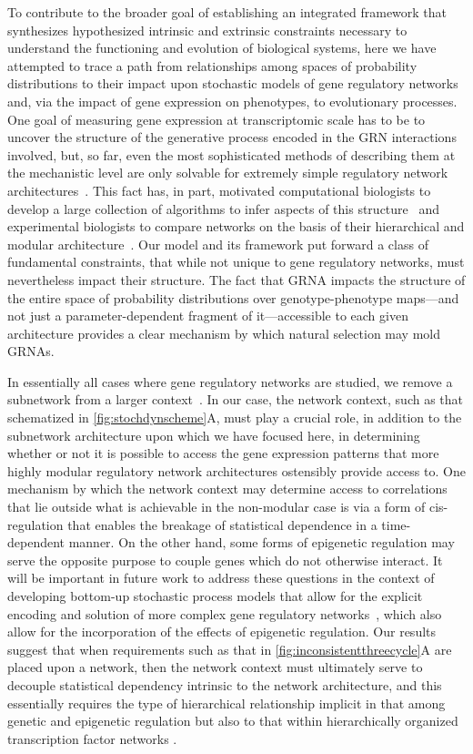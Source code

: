To contribute to the broader goal of establishing an integrated framework that synthesizes hypothesized intrinsic and extrinsic constraints necessary to understand the functioning and evolution of biological systems, here we have attempted to trace a path from relationships among spaces of probability distributions to their impact upon stochastic models of gene regulatory networks and, via the impact of gene expression on phenotypes, to evolutionary processes. One goal of measuring gene expression at transcriptomic scale has to be to uncover the structure of the generative process encoded in the GRN interactions involved, but, so far, even the most sophisticated methods of describing them at the mechanistic level are only solvable for extremely simple regulatory network architectures~\cite{Walczak2009,Mugler2009}. This fact has, in part, motivated computational biologists to develop a large collection of algorithms to infer aspects of this structure~\cite{DeSmet2010} and experimental biologists to compare networks on the basis of their hierarchical and modular architecture~\cite{Ideker2012}. Our model and its framework put forward a class of fundamental constraints, that while not unique to gene regulatory networks, must nevertheless impact their structure. The fact that GRNA impacts the structure of the entire space of probability distributions over genotype-phenotype maps---and not just a parameter-dependent fragment of it---accessible to each given architecture provides a clear mechanism by which natural selection may mold GRNAs.

In essentially all cases where gene regulatory networks are studied, we remove a subnetwork from a larger context~\cite{Alon2007}. In our case, the network context, such as that schematized in \ref{fig:stochdynscheme}A, must play a crucial role, in addition to the subnetwork architecture upon which we have focused here, in determining whether or not it is possible to access the gene expression patterns that more highly modular regulatory network architectures ostensibly provide access to. One mechanism by which the network context may determine access to correlations that lie outside what is achievable in the non-modular case is via a form of cis-regulation that enables the breakage of statistical dependence in a time-dependent manner. On the other hand, some forms of epigenetic regulation may serve the opposite purpose to couple genes which do not otherwise interact. It will be important in future work to address these questions in the context of developing bottom-up stochastic process models that allow for the explicit encoding and solution of more complex gene regulatory networks~\cite{Walczak2009,Mugler2009}, which also allow for the incorporation of the effects of epigenetic regulation. Our results suggest that when requirements such as that in \ref{fig:inconsistentthreecycle}A are placed upon a network, then the network context must ultimately serve to decouple statistical dependency intrinsic to the network architecture, and this essentially requires the type of hierarchical relationship implicit in that among genetic and epigenetic regulation but also to that within hierarchically organized transcription factor networks \cite{Jothi2009,Bhardwaj2010,Chalancon2012,Colm}.

